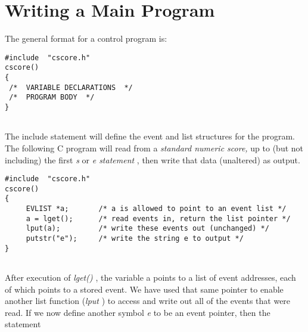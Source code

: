 \begin{comment}
\documentclass[10pt]{article}
\usepackage{fullpage, graphicx, url}
\setlength{\parskip}{1ex}
\setlength{\parindent}{0ex}
\title{Writing a Main Program}



\begin{tabular}{ccc}
The Alternative Csound Reference Manual & & \\
Previous &Cscore &Next

\end{tabular}

\end{comment}
\section{Writing a Main Program}


  The general format for a control program is: 


 
\begin{lstlisting}
#include  "cscore.h" 
cscore() 
{ 
 /*  VARIABLE DECLARATIONS  */ 
 /*  PROGRAM BODY  */ 
}
      
\end{lstlisting}


 


  The include statement will define the event and list structures for the program. The following C program will read from a\emph{ standard numeric score,}
 up to (but not including) the first \emph{s}
 or \emph{e statement}
, then write that data (unaltered) as output. 


 


 
\begin{lstlisting}
#include  "cscore.h" 
cscore() 
{ 
     EVLIST *a;       /* a is allowed to point to an event list */ 
     a = lget();      /* read events in, return the list pointer */ 
     lput(a);         /* write these events out (unchanged) */ 
     putstr("e");     /* write the string e to output */ 
}
      
\end{lstlisting}


 


  After execution of \emph{lget()}
, the variable a points to a list of event addresses, each of which points to a stored event. We have used that same pointer to enable another list function (\emph{lput}
) to access and write out all of the events that were read. If we now define another symbol \emph{e}
 to be an event pointer, then the statement 


